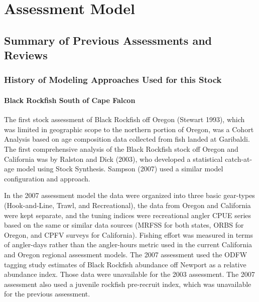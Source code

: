 \documentclass[11pt,
  english,
  letterpaper,
]{article}
\begin{document}
\hypertarget{assessment-model}{%
\section{Assessment Model}\label{assessment-model}}

\hypertarget{summary-of-previous-assessments-and-reviews}{%
\subsection{Summary of Previous Assessments and Reviews}\label{summary-of-previous-assessments-and-reviews}}

\hypertarget{history-of-modeling-approaches-used-for-this-stock}{%
\subsubsection{History of Modeling Approaches Used for this Stock}\label{history-of-modeling-approaches-used-for-this-stock}}

\hypertarget{black-rockfish-south-of-cape-falcon}{%
\paragraph{Black Rockfish South of Cape Falcon}\label{black-rockfish-south-of-cape-falcon}}

The first stock assessment of Black Rockfish off Oregon (Stewart 1993), which was limited in geographic scope to the northern portion of Oregon, was a Cohort Analysis based on age composition data collected from fish landed at Garibaldi. The first comprehensive analysis of the Black Rockfish stock off Oregon and California was by Ralston and Dick (2003), who developed a statistical catch-at-age model using Stock Synthesis. Sampson (2007) used a similar model configuration and approach.

In the 2007 assessment model the data were organized into three basic gear-types (Hook-and-Line, Trawl, and Recreational), the data from Oregon and California were kept separate, and the tuning indices were recreational angler CPUE series based on the same or similar data sources (MRFSS for both states, ORBS for Oregon, and CPFV surveys for California). Fishing effort was measured in terms of angler-days rather than the angler-hours metric used in the current California and Oregon regional assessment models. The 2007 assessment used the ODFW tagging study estimates of Black Rockfish abundance off Newport as a relative abundance index. Those data were unavailable for the 2003 assessment. The 2007 assessment also used a juvenile rockfish pre-recruit index, which was unavailable for the previous assessment.
\end{document}
